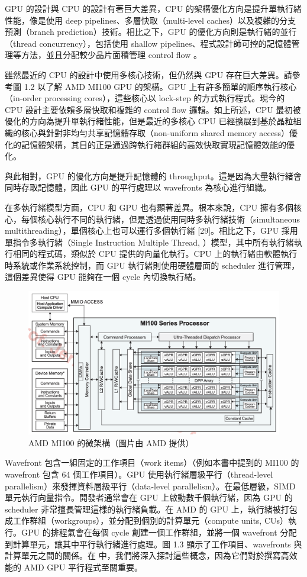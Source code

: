 GPU 的設計與 CPU 的設計有著巨大差異，CPU 的架構優化方向是提升單執行緒性能，像是使用 deep pipelines、多層快取（multi-level caches）以及複雜的分支預測（branch prediction）技術。相比之下，GPU 的優化方向則是執行緒的並行（thread concurrency），包括使用 shallow pipelines、程式設計師可控的記憶體管理等方法，並且分配較少晶片面積管理 control flow 。

雖然最近的 CPU 的設計中使用多核心技術，但仍然與 GPU 存在巨大差異。請參考圖 1.2 以了解 AMD MI100 GPU 的架構。GPU 上有許多簡單的順序執行核心（in-order processing cores），這些核心以 lock-step 的方式執行程式。現今的 CPU 設計主要依賴多層快取和複雜的 control flow 邏輯。如上所述，CPU 最初被優化的方向為提升單執行緒性能，但是最近的多核心 CPU 已經擴展到基於晶粒組織的核心與針對非均勻共享記憶體存取（non-uniform shared memory access）優化的記憶體架構，其目的正是通過跨執行緒群組的高效快取實現記憶體效能的優化。

與此相對，GPU 的優化方向是提升記憶體的 throughput。這是因為大量執行緒會同時存取記憶體，因此 GPU 的平行處理以 wavefronts 為核心進行組織。

在多執行緒模型方面，CPU 和 GPU 也有顯著差異。根本來說，CPU 擁有多個核心，每個核心執行不同的執行緒，但是透過使用同時多執行緒技術（simultaneous multithreading），單個核心上也可以運行多個執行緒 [29]。相比之下，GPU 採用單指令多執行緒（Single Instruction Multiple Thread, ）模型，其中所有執行緒執行相同的程式碼，類似於 CPU 提供的向量化執行。CPU 上的執行緒由軟體執行時系統或作業系統控制，而 GPU 執行緒則使用硬體層面的 scheduler 進行管理，這個差異使得 GPU 能夠在一個 cycle 內切換執行緒。

\begin{figure}[h]
    \centering
    \includegraphics[width=0.8\linewidth]{FileAusiliari/Screenshots/Figure1-2.png}
    \caption{AMD MI100 的微架構（圖片由 AMD 提供）}
    \label{fig:lds}
\end{figure}

Wavefront 包含一組固定的工作項目（work items）（例如本書中提到的 MI100 的 wavefront 包含 64 個工作項目）。GPU 使用執行緒層級平行（thread-level parallelism）來發揮資料層級平行（data-level parallelism）。在最低層級，SIMD 單元執行向量指令。開發者通常會在 GPU 上啟動數千個執行緒，因為 GPU 的 scheduler 非常擅長管理這樣的執行緒負載。在 AMD 的 GPU 上，執行緒被打包成工作群組（workgroups），並分配到個別的計算單元（compute units, CUs）執行。GPU 的排程氣會在每個 cycle 創建一個工作群組，並將一個 wavefront 分配到計算單元，讓其中平行執行緒進行處理。圖 1.3 顯示了工作項目、wavefronts 與計算單元之間的關係。在  中，我們將深入探討這些概念，因為它們對於撰寫高效能的 AMD GPU 平行程式至關重要。

